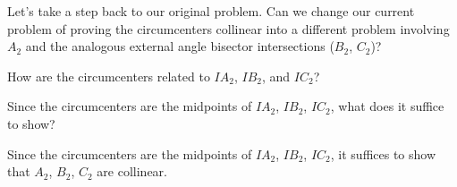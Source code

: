 Let's take a step back to our original problem. Can we change our current problem of proving the circumcenters collinear into a different problem involving $A_2$ and the analogous external angle bisector intersections ($B_2$, $C_2$)?

How are the circumcenters related to $IA_2$, $IB_2$, and $IC_2$?



Since the circumcenters are the midpoints of $IA_2$, $IB_2$, $IC_2$, what does it suffice to show?





Since the circumcenters are the midpoints of $IA_2$, $IB_2$, $IC_2$, it suffices to show that $A_2$, $B_2$, $C_2$ are collinear.




